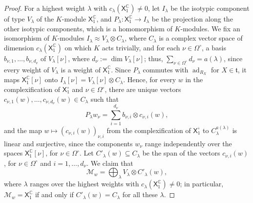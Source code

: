 \documentclass{article}
\newcommand{\C}{\mathbb{C}}
\newcommand{\frakt}{\mathfrak{t}}
\newcommand{\sX}{\mathsf{X}}
\newcommand{\xc}[1]{\vspace{.1cm}
\noindent {\em #1} }
\theoremstyle{definition}
\theoremstyle{plain}
\begin{document}
\begin{proof}
\xc{Step~2: description of $\mathcal M_w$.}
For a highest weight $\lambda$ with $c_\lambda(\sX_1^\C)\neq0$, let $I_\lambda$ be the isotypic component of type $V_\lambda$ of the $K$-module $\sX_1^\C$, and $P_\lambda\colon\sX_1^\C\to I_\lambda$ be the projection along the other isotypic components, which is a homomorphism of $K$-modules.
We fix an isomorphism of $K$-modules $I_\lambda\approx V_\lambda\otimes C_\lambda$, where $C_\lambda$ is a complex vector space of dimension $c_\lambda(\sX_1^\C)$ on which $K$ acts trivially, and for each $\nu\in\Omega^\circ$, a basis $b_{\nu,1},\ldots,b_{\nu,d_\nu}$ of $V_\lambda[\nu]$, where $d_\nu:=\dim V_\lambda[\nu]$; thus, $\sum_{\nu\in\Omega^\circ}d_\nu=a(\lambda)$, since every weight of $V_\lambda$ is a weight of $\sX_1^\C$.
Since $P_\lambda$ commutes with $\operatorname{ad}_{R_X}$ for $X\in\frakt$, it maps $\sX_1^\C[\nu]$ onto $I_\lambda[\nu]=V_\lambda[\nu]\otimes C_\lambda$.
Hence, for every $w$ in the complexification of $\sX_1^\circ$ and $\nu\in\Omega^\circ$, there are unique vectors $c_{\nu,1}(w),\ldots,c_{\nu,d_\nu}(w)\in C_\lambda$ such that
\begin{equation}\label{eq:components}
P_\lambda w_\nu=\sum_{i=1}^{d_\nu}b_{\nu,i}\otimes c_{\nu,i}(w),
\end{equation}
and the map $w\mapsto(c_{\nu,i}(w))_{\nu,i}$ from the complexification of $\sX_1^\circ$ to $C_\lambda^{a(\lambda)}$ is linear and surjective, since the components $w_\nu$ range independently over the spaces $\sX_1^\C[\nu]$, for $\nu\in\Omega^\circ$.
Let $C'_\lambda(w)\subseteq C_\lambda$ be the span of the vectors $c_{\nu,i}(w)$, for $\nu\in\Omega^\circ$ and $i=1,\ldots,d_\nu$.
We claim that
\begin{equation}\label{eq:M-w}
\mathcal M_w=\bigoplus_\lambda V_\lambda\otimes C'_\lambda(w),
\end{equation}
where $\lambda$ ranges over the highest weights with $c_\lambda(\sX_1^\C)\neq0$; in particular, $\mathcal M_w=\sX_1^\C$ if and only if $C'_\lambda(w)=C_\lambda$ for all these $\lambda$.


\end{proof}
\end{document}
